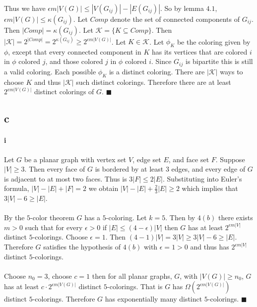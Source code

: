 \documentclass[letterpaper,12pt,oneside,onecolumn]{report}
\begin{document}
\paragraph{}
Thus we have $\epsilon m |V(G)| \leq |V(G_{ij})| - |E(G_{ij})|$. So by lemma $4.1$, $\epsilon m |V(G)| \leq \kappa(G_{ij})$. Let $Comp$ denote the set of connected components of $G_{ij}$. Then $|Comp| = \kappa(G_{ij})$. Let $\mathcal{K} = \{ K \subseteq Comp \}$. Then $|\mathcal{K}| = 2^{|Comp|} = 2^{\kappa(G_{ij})} \geq 2^{\epsilon m |V(G)|}$. Let $K \in \mathcal{K}$. Let $\phi_{K}$ be the coloring given by $\phi$, except that every connected component in $K$ has its vertices that are colored $i$ in $\phi$ colored $j$, and those colored $j$ in $\phi$ colored $i$. Since $G_{ij}$ is bipartite this is still a valid coloring. Each possible $\phi_{K}$ is a distinct coloring. There are $|\mathcal{K}|$ ways to choose $K$ and thus $|\mathcal{K}|$ such distinct colorings. Therefore there are at least $2^{\epsilon m |V(G)|}$ distinct colorings of $G$. $\blacksquare$
\subsection*{c}
\paragraph{i}
Let $G$ be a planar graph with vertex set $V$, edge set $E$, and face set $F$. Suppose $|V| \geq 3$. Then every face of $G$ is bordered by at least $3$ edges, and every edge of $G$ is adjacent to at most two faces. Thus is $3|F| \leq 2|E|$. Substituting into Euler's formula, $|V| - |E| + |F| = 2$ we obtain $|V| -|E| + \frac{2}{3}|E| \geq 2$ which implies that $3|V| - 6 \geq |E|$.
\paragraph{}
By the $5$-color theorem $G$ has a $5$-coloring. Let $k = 5$. Then by $4(b)$ there exists $m > 0$ such that for every $\epsilon > 0 $ if $|E| \leq (4 - \epsilon)|V|$ then $G$ has at least $2^{\epsilon m |V|}$ distinct $5$-colorings. Choose $\epsilon = 1$. Then $(4 - 1)|V| = 3|V|\geq 3|V| - 6 \geq |E|$. Therefore $G$ satisfies the hypothesis of $4(b)$ with $\epsilon = 1 > 0$ and thus has $2^{\epsilon m |V|}$ distinct $5$-colorings.
\paragraph{}
Choose $n_0 = 3$, choose $c = 1$ then for all planar graphs, $G$, with $|V(G)| \geq n_0$, $G$ has at least $c \cdot 2^{\epsilon m |V(G)|}$ distinct $5$-colorings. That is $G$ has $\Omega(2^{\epsilon m |V(G)|})$ distinct $5$-colorings. Therefore $G$ has exponentially many distinct $5$-colorings. $\blacksquare$
\end{document}
